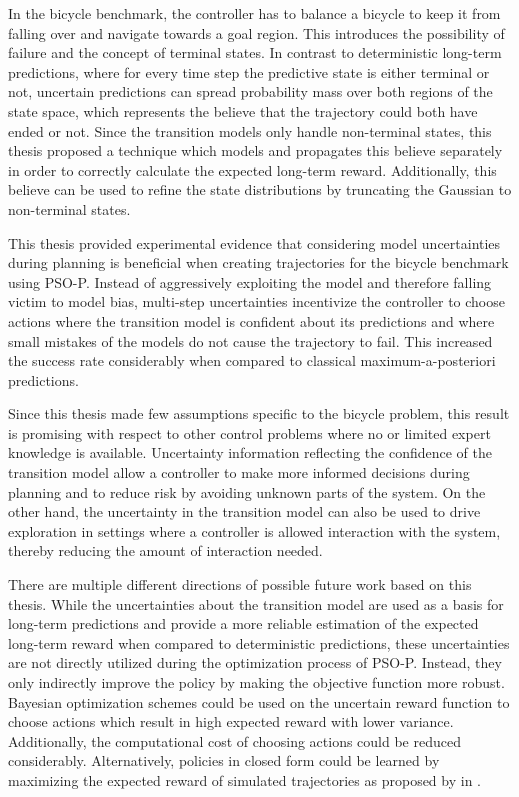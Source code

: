 In the bicycle benchmark, the controller has to balance a bicycle to keep it from falling over and navigate towards a goal region.
This introduces the possibility of failure and the concept of terminal states.
In contrast to deterministic long-term predictions, where for every time step the predictive state is either terminal or not, uncertain predictions can spread probability mass over both regions of the state space, which represents the believe that the trajectory could both have ended or not.
Since the transition models only handle non-terminal states, this thesis proposed a technique which models and propagates this believe separately in order to correctly calculate the expected long-term reward.
Additionally, this believe can be used to refine the state distributions by truncating the Gaussian to non-terminal states.

This thesis provided experimental evidence that considering model uncertainties during planning is beneficial when creating trajectories for the bicycle benchmark using PSO-P.
Instead of aggressively exploiting the model and therefore falling victim to model bias, multi-step uncertainties incentivize the controller to choose actions where the transition model is confident about its predictions and where small mistakes of the models do not cause the trajectory to fail.
This increased the success rate considerably when compared to classical maximum-a-posteriori predictions.

Since this thesis made few assumptions specific to the bicycle problem, this result is promising with respect to other control problems where no or limited expert knowledge is available.
Uncertainty information reflecting the confidence of the transition model allow a controller to make more informed decisions during planning and to reduce risk by avoiding unknown parts of the system.
On the other hand, the uncertainty in the transition model can also be used to drive exploration in settings where a controller is allowed interaction with the system, thereby reducing the amount of interaction needed.

There are multiple different directions of possible future work based on this thesis.
While the uncertainties about the transition model are used as a basis for long-term predictions and provide a more reliable estimation of the expected long-term reward when compared to deterministic predictions, these uncertainties are not directly utilized during the optimization process of PSO-P.
Instead, they only indirectly improve the policy by making the objective function more robust.
Bayesian optimization schemes \cite{brochu_tutorial_2010} could be used on the uncertain reward function to choose actions which result in high expected reward with lower variance.
Additionally, the computational cost of choosing actions could be reduced considerably.
Alternatively, policies in closed form could be learned by maximizing the expected reward of simulated trajectories as proposed by \citeauthor{deisenroth_efficient_2010} in \cite{deisenroth_efficient_2010}.

